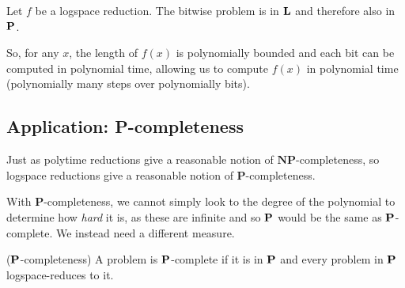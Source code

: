 \documentclass{article}
\newcommand{\NP}{\mathbf{NP}}
\begin{document}
Let $f$ be a logspace reduction. The bitwise problem is in $\bf L$ and therefore also in $\bf P$.

So, for any $x$, the length of $f(x)$ is polynomially bounded and each bit can be computed in polynomial time, allowing us to compute $f(x)$ in polynomial time (polynomially many steps over polynomially bits).

\subsection{Application: \textbf{P}-completeness}

Just as polytime reductions give a reasonable notion of $\NP$-completeness, so logspace reductions give a reasonable notion of $\mathbf{P} $-completeness.

With $\mathbf{P} $-completeness, we cannot simply look to the degree of the polynomial to determine how \textit{hard} it is, as these are infinite and so $\bf P$ would be the same as $\bf P$-complete. We instead need a different measure.

\begin{definition}($\bf P$-completeness)
A problem is $\bf P$-complete if it is in $\bf P$ and every problem in $\bf P$ logspace-reduces to it.
\end{definition}
\end{document}
